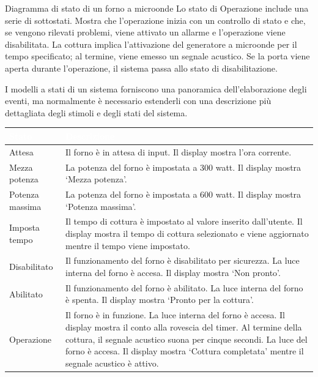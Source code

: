 \begin{Example}{Diagramma di stato di un forno a microonde}{}
Lo stato di Operazione include una serie di sottostati. Mostra che l'operazione inizia con un controllo di stato e che, se vengono rilevati problemi, viene attivato un allarme e l'operazione viene disabilitata. La cottura implica l'attivazione del generatore a microonde per il tempo specificato; al termine, viene emesso un segnale acustico. Se la porta viene aperta durante l'operazione, il sistema passa allo stato di disabilitazione.

I modelli a stati di un sistema forniscono una panoramica dell'elaborazione degli eventi, ma normalmente è necessario estenderli con una descrizione più dettagliata degli stimoli e degli stati del sistema.

\vspace{0.1cm}
\begin{minipage}{\textwidth}
\begin{tabular}{|p{3cm}|p{10.5cm}|}
\hline
\rowcolor{headerblue}
\textbf{\textcolor{white}{Stato}} & \textbf{\textcolor{white}{Descrizione}} \\\hline
Attesa & Il forno è in attesa di input. Il display mostra l’ora corrente.\\\hline
Mezza potenza & La potenza del forno è impostata a 300 watt. Il display mostra ‘Mezza potenza’.\\\hline
Potenza massima & La potenza del forno è impostata a 600 watt. Il display mostra ‘Potenza massima’.\\\hline
Imposta tempo & Il tempo di cottura è impostato al valore inserito dall’utente. Il display mostra il tempo di cottura selezionato e viene aggiornato mentre il tempo viene impostato.\\\hline
Disabilitato & Il funzionamento del forno è disabilitato per sicurezza. La luce interna del forno è accesa. Il display mostra ‘Non pronto’.\\\hline
Abilitato & Il funzionamento del forno è abilitato. La luce interna del forno è spenta. Il display mostra ‘Pronto per la cottura’.\\\hline
Operazione & Il forno è in funzione. La luce interna del forno è accesa. Il display mostra il conto alla rovescia del timer. Al termine della cottura, il segnale acustico suona per cinque secondi. La luce del forno è accesa. Il display mostra ‘Cottura completata’ mentre il segnale acustico è attivo.\\\hline
\end{tabular}
\end{minipage}


\end{Example}
